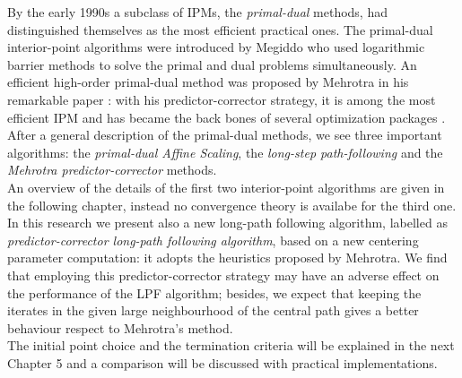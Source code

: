 \documentclass[a4paper,10 pt,titlepage,twoside]{book}
\theoremstyle{plain}
\theoremstyle{definition}
\theoremstyle{remark}
\begin{document}
By the early 1990s  a subclass of IPMs, the \textit{primal-dual} methods, had distinguished themselves as the most efficient practical ones. The primal-dual interior-point algorithms were introduced by Megiddo \cite{meg} who used logarithmic barrier methods to solve
the primal and dual problems simultaneously. An efficient
high-order primal-dual method was proposed by Mehrotra in his remarkable paper \cite{MER}: with his predictor-corrector
strategy, it is among the most efficient IPM and has became the back bones
of several optimization packages \cite{matlab}.\\ 
After a general description of the primal-dual methods, we see three important algorithms: the \textit{primal-dual Affine Scaling}, the \textit{long-step path-following} and the \textit{Mehrotra predictor-corrector} methods.\\
An overview of the details of the first two interior-point algorithms are given in the following chapter, instead no convergence theory is availabe for the third one. \\
In this research we present also a new long-path following algorithm, labelled as \textit{predictor-corrector long-path following algorithm}, based on a new centering parameter computation: it adopts the heuristics proposed by
Mehrotra. We find that employing this predictor-corrector strategy may have an adverse effect on the performance of the LPF algorithm; besides, we expect that keeping the iterates in the given large neighbourhood
of the central path gives a better behaviour respect to Mehrotra's method.\\ The initial point choice and the
termination criteria will be explained in the next Chapter 5 and a comparison will be discussed with practical implementations.

\newpage
\end{document}
